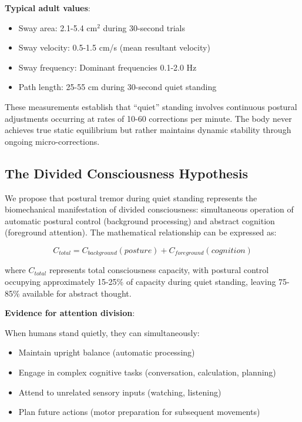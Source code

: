 \documentclass[12pt,a4paper]{article}
\begin{document}
\textbf{Typical adult values}:
\begin{itemize}
\item Sway area: 2.1-5.4 cm$^2$ during 30-second trials
\item Sway velocity: 0.5-1.5 cm/s (mean resultant velocity)
\item Sway frequency: Dominant frequencies 0.1-2.0 Hz
\item Path length: 25-55 cm during 30-second quiet standing
\end{itemize}

These measurements establish that ``quiet'' standing involves continuous postural adjustments occurring at rates of 10-60 corrections per minute. The body never achieves true static equilibrium but rather maintains dynamic stability through ongoing micro-corrections.

\subsection{The Divided Consciousness Hypothesis}

We propose that postural tremor during quiet standing represents the biomechanical manifestation of divided consciousness: simultaneous operation of automatic postural control (background processing) and abstract cognition (foreground attention). The mathematical relationship can be expressed as:

\begin{equation}
C_{total} = C_{background}(posture) + C_{foreground}(cognition)
\end{equation}

where $C_{total}$ represents total consciousness capacity, with postural control occupying approximately 15-25\% of capacity during quiet standing, leaving 75-85\% available for abstract thought.

\textbf{Evidence for attention division}:

When humans stand quietly, they can simultaneously:
\begin{itemize}
\item Maintain upright balance (automatic processing)
\item Engage in complex cognitive tasks (conversation, calculation, planning)
\item Attend to unrelated sensory inputs (watching, listening)
\item Plan future actions (motor preparation for subsequent movements)
\end{itemize}
\end{document}
